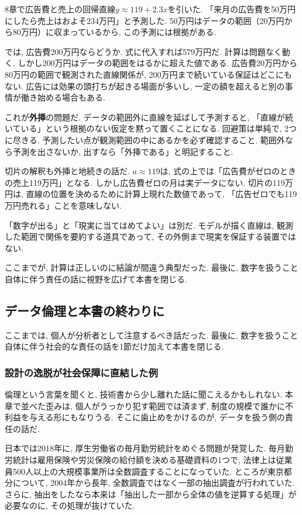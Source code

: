 8章で広告費と売上の回帰直線$y \approx 119 + 2.3x$を引いた.
「来月の広告費を50万円にしたら売上はおよそ234万円」と予測した.
50万円はデータの範囲（20万円から80万円）に収まっているから, この予測には根拠がある.

では, 広告費200万円ならどうか.
式に代入すれば579万円だ. 計算は問題なく動く.
しかし200万円はデータの範囲をはるかに超えた値である.
広告費20万円から80万円の範囲で観測された直線関係が, 200万円まで続いている保証はどこにもない.
広告には効果の頭打ちが起きる場面が多いし, 一定の額を超えると別の事情が働き始める場合もある.

これが\textbf{外挿}の問題だ.
データの範囲外に直線を延ばして予測すると, 「直線が続いている」という根拠のない仮定を黙って置くことになる.
回避策は単純で, 2つに尽きる. 予測したい点が観測範囲の中にあるかを必ず確認すること. 範囲外なら予測を出さないか, 出すなら「外挿である」と明記すること.

切片の解釈も外挿と地続きの話だ.
$a \approx 119$は, 式の上では「広告費がゼロのときの売上119万円」となる.
しかし広告費ゼロの月は実データにない.
切片の119万円は, 直線の位置を決めるために計算上現れた数値であって, 「広告ゼロでも119万円売れる」ことを意味しない.

「数字が出る」と「現実に当てはめてよい」は別だ.
モデルが描く直線は, 観測した範囲で関係を要約する道具であって, その外側まで現実を保証する装置ではない.

ここまでが, 計算は正しいのに結論が間違う典型だった.
最後に, 数字を扱うこと自体に伴う責任の話に視野を広げて本書を閉じる.


\subsection{データ倫理と本書の終わりに}

ここまでは, 個人が分析者として注意するべき話だった.
最後に, 数字を扱うこと自体に伴う社会的な責任の話を1節だけ加えて本書を閉じる.

\subsubsection*{設計の逸脱が社会保障に直結した例}

倫理という言葉を聞くと, 技術書から少し離れた話に聞こえるかもしれない.
本章で並べた歪みは, 個人がうっかり犯す範囲では済まず, 制度の規模で誰かに不利益を与える形にもなりうる.
そこに歯止めをかけるのが, データを扱う側の責任の話だ.

日本では2018年に, 厚生労働省の毎月勤労統計をめぐる問題が発覚した.
毎月勤労統計は雇用保険や労災保険の給付額を決める基礎資料の1つで, 法律上は従業員500人以上の大規模事業所は全数調査することになっていた.
ところが東京都分について, 2004年から長年, 全数調査ではなく一部の抽出調査が行われていた.
さらに, 抽出をしたなら本来は「抽出した一部から全体の値を逆算する処理」が必要なのに, その処理が抜けていた.

